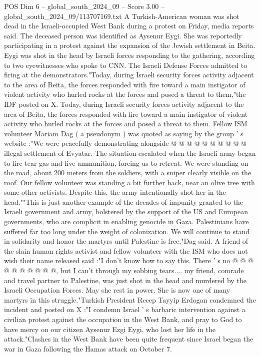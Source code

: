 \begin{textsample}{POS Dim 6 – global\_south\_2024\_09 – Score 3.00 – global\_south\_2024\_09/113707169.txt}  \label{ex:f6_pos_423}
A Turkish-American woman was shot dead in the Israeli-occupied West Bank during a protest on Friday, media reports said.
The deceased person was identified as Aysenur Eygi.
She was reportedly participating in a protest against the expansion of the Jewish settlement in Beita.
Eygi was shot in the head by Israeli forces responding to the gathering, according to two eyewitnesses who spoke to CNN.
The Israeli Defense Forces admitted to firing at the demonstrators."Today, during Israeli security forces activity adjacent to the area of Beita, the forces responded with fire toward a main instigator of violent activity who hurled rocks at the forces and posed a threat to them,"the IDF posted on X.
Today, during Israeli security forces activity adjacent to the area of Beita, the forces responded with fire toward a main instigator of violent activity who hurled rocks at the forces and posed a threat to them.
Fellow ISM volunteer Mariam Dag ( a pseudonym ) was quoted as saying by the group ' s website :"We were peacefully demonstrating alongside @ @ @ @ @ @ @ @ @ @ illegal settlement of Evyatar.
The situation escalated when the Israeli army began to fire tear gas and live ammunition, forcing us to retreat.
We were standing on the road, about 200 meters from the soldiers, with a sniper clearly visible on the roof.
Our fellow volunteer was standing a bit further back, near an olive tree with some other activists.
Despite this, the army intentionally shot her in the head.""This is just another example of the decades of impunity granted to the Israeli government and army, bolstered by the support of the US and European governments, who are complicit in enabling genocide in Gaza.
Palestinians have suffered far too long under the weight of colonization.
We will continue to stand in solidarity and honor the martyrs until Palestine is free,"Dag said.
A friend of the slain human rights activist and fellow volunteer with the ISM who does not wish their name released said :"I don't know how to say this.
There ' s no @ @ @ @ @ @ @ @ @ @, but I can't through my sobbing tears.... my friend, comrade and travel partner to Palestine, was just shot in the head and murdered by the Israeli Occupation Forces.
May she rest in power.
She is now one of many martyrs in this struggle."Turkish President Recep Tayyip Erdogan condemned the incident and posted on X :"I condemn Israel ' s barbaric intervention against a civilian protest against the occupation in the West Bank, and pray to God to have mercy on our citizen Aysenur Ezgi Eygi, who lost her life in the attack."Clashes in the West Bank have been quite frequent since Israel began the war in Gaza following the Hamas attack on October 7.

\end{textsample}
